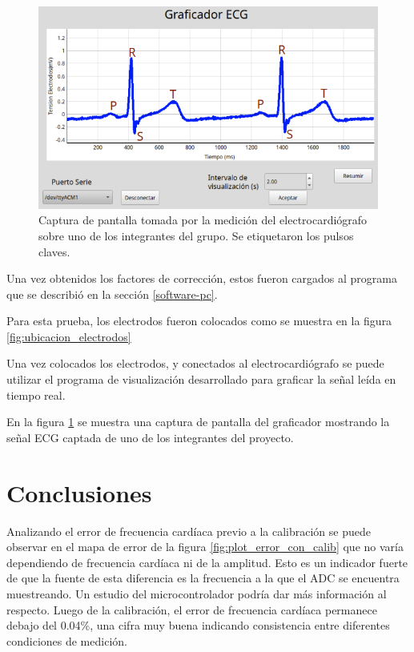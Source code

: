 \documentclass[conference]{IEEEtran}
\begin{document}
\begin{figure}[tb]
    \centering
    \includegraphics[width=\linewidth]{figs/graficador_ecg_etiquetado.png}
    \caption{Captura de pantalla tomada por la medición del electrocardiógrafo
    sobre  uno de los integrantes del grupo. Se etiquetaron los pulsos claves.}
    \label{fig:ecg_real}
\end{figure}

Una vez obtenidos los factores de corrección, estos fueron cargados al programa
que se describió en la sección \ref{software-pc}.

Para esta prueba, los electrodos fueron colocados como se muestra en la figura
\ref{fig:ubicacion_electrodos}

Una vez colocados los electrodos, y conectados al electrocardiógrafo se puede
utilizar el programa de visualización desarrollado para graficar la señal leída
en tiempo real.

En la figura \ref{fig:ecg_real} se muestra una captura de pantalla del
graficador mostrando la señal ECG captada de uno de los integrantes del
proyecto.

\section{Conclusiones}

Analizando el error de frecuencia cardíaca previo a la calibración se puede
observar en el mapa de error de la figura \ref{fig:plot_error_con_calib} que no
varía dependiendo de frecuencia cardíaca ni de la amplitud. Esto es un indicador
fuerte de que la fuente de esta diferencia es la frecuencia a la que el ADC se
encuentra muestreando. Un estudio del microcontrolador podría dar más
información al respecto. Luego de la calibración, el error de frecuencia
cardíaca permanece debajo del 0.04\%, una cifra muy buena indicando consistencia
entre diferentes condiciones de medición.
\end{document}
